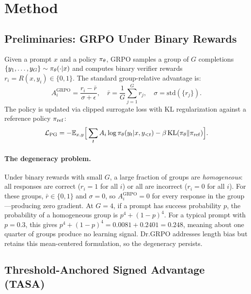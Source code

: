 \section{Method}
\label{sec:method}

\subsection{Preliminaries: GRPO Under Binary Rewards}
\label{sec:prelim}

Given a prompt $x$ and a policy $\pi_{\theta}$, GRPO \citep{shao2024deepseekmath} samples a group of $G$ completions $\{y_1, \ldots, y_G\} \sim \pi_{\theta}(\cdot|x)$ and computes binary verifier rewards $r_i = R(x, y_i) \in \{0, 1\}$.
The standard group-relative advantage is:
\begin{equation}
\label{eq:grpo_adv}
A_i^{\mathrm{GRPO}} = \frac{r_i - \bar{r}}{\sigma + \epsilon}, \quad \bar{r} = \frac{1}{G}\sum_{j=1}^G r_j, \quad \sigma = \mathrm{std}(\{r_j\}).
\end{equation}
The policy is updated via clipped surrogate loss with KL regularization against a reference policy $\pi_{\mathrm{ref}}$:
\begin{equation}
\mathcal{L}_{\mathrm{PG}} = -\mathbb{E}_{x,y}\Big[\sum_t A_i \log \pi_{\theta}(y_t | x, y_{<t}) - \beta \, \mathrm{KL}(\pi_{\theta} \| \pi_{\mathrm{ref}})\Big].
\end{equation}

\paragraph{The degeneracy problem.}
Under binary rewards with small $G$, a large fraction of groups are \emph{homogeneous}: all responses are correct ($r_i = 1$ for all $i$) or all are incorrect ($r_i = 0$ for all $i$).
For these groups, $\bar{r} \in \{0, 1\}$ and $\sigma = 0$, so $A_i^{\mathrm{GRPO}} = 0$ for every response in the group---producing zero gradient.
At $G{=}4$, if a prompt has success probability $p$, the probability of a homogeneous group is $p^4 + (1-p)^4$.
For a typical prompt with $p=0.3$, this gives $p^4 + (1-p)^4 = 0.0081 + 0.2401 = 0.248$, meaning about one quarter of groups produce no learning signal.
Dr.GRPO \citep{liu2025understanding} addresses length bias but retains this mean-centered formulation, so the degeneracy persists.

\subsection{Threshold-Anchored Signed Advantage (TASA)}
\label{sec:tasa}

